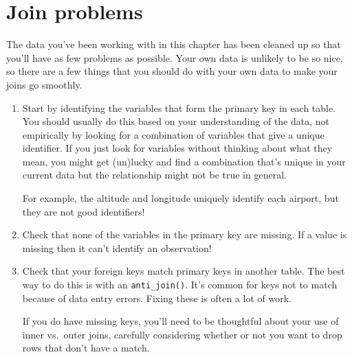 \documentclass[]{book}
\newenvironment{Shaded}{\begin{snugshade}}{\end{snugshade}}
\newcommand{\KeywordTok}[1]{\textcolor[rgb]{0.13,0.29,0.53}{\textbf{{#1}}}}
\newcommand{\DecValTok}[1]{\textcolor[rgb]{0.00,0.00,0.81}{{#1}}}
\newcommand{\StringTok}[1]{\textcolor[rgb]{0.31,0.60,0.02}{{#1}}}
\newcommand{\CommentTok}[1]{\textcolor[rgb]{0.56,0.35,0.01}{\textit{{#1}}}}
\newcommand{\NormalTok}[1]{{#1}}
\begin{document}
\section{Join problems}\label{join-problems}

The data you've been working with in this chapter has been cleaned up so
that you'll have as few problems as possible. Your own data is unlikely
to be so nice, so there are a few things that you should do with your
own data to make your joins go smoothly.

\begin{enumerate}
\def\labelenumi{\arabic{enumi}.}
\item
  Start by identifying the variables that form the primary key in each
  table. You should usually do this based on your understanding of the
  data, not empirically by looking for a combination of variables that
  give a unique identifier. If you just look for variables without
  thinking about what they mean, you might get (un)lucky and find a
  combination that's unique in your current data but the relationship
  might not be true in general.

  For example, the altitude and longitude uniquely identify each
  airport, but they are not good identifiers!

\begin{Shaded}
\end{Shaded}
\item
  Check that none of the variables in the primary key are missing. If a
  value is missing then it can't identify an observation!
\item
  Check that your foreign keys match primary keys in another table. The
  best way to do this is with an \texttt{anti\_join()}. It's common for
  keys not to match because of data entry errors. Fixing these is often
  a lot of work.

  If you do have missing keys, you'll need to be thoughtful about your
  use of inner vs.~outer joins, carefully considering whether or not you
  want to drop rows that don't have a match.
\end{enumerate}
\end{document}
